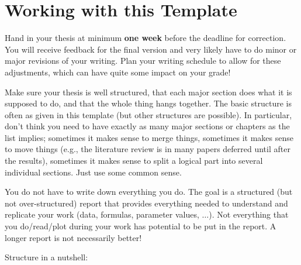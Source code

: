 
\chapter{Working with this Template}
\label{sec:Tutorial}

Hand in your thesis at minimum \textbf{one week} before the deadline for correction. You will receive feedback for the final version and very likely have to do minor or major revisions of your writing. Plan your writing schedule to allow for these adjustments, which can have quite some impact on your grade! 



Make sure your thesis is well structured, that each major section does what it is supposed to do, and that the whole thing hangs together. The basic structure is often as given in this template (but other structures are possible). In particular, don't think you need to have exactly as many major sections or chapters as the list implies; sometimes it makes sense to merge things, sometimes it makes sense to move things (e.g., the literature review is in many papers deferred until after the results), sometimes it makes sense to split a logical part into several individual sections. Just use some common sense. 

You do not have to write down everything you do. The goal is a structured (but not over-structured) report that provides everything needed to understand and replicate your work (data, formulas, parameter values, $\ldots$). Not everything that you do/read/plot during your work has potential to be put in the report. A longer report is not necessarily better!

\vspace{\baselineskip}

Structure in a nutshell:

